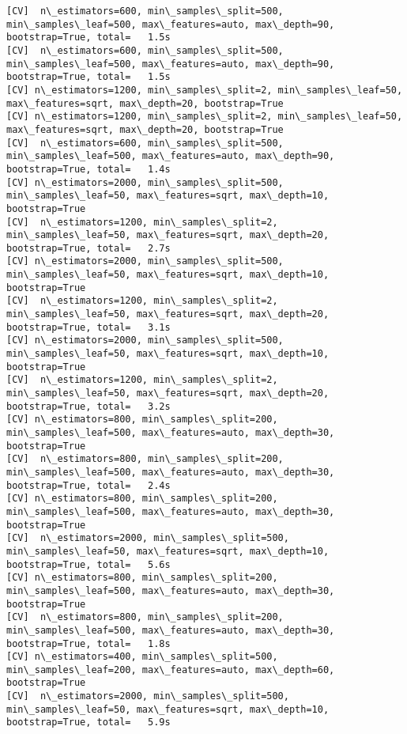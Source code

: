\documentclass[11pt]{article}
\begin{document}
    \begin{Verbatim}[commandchars=\\\{\}]
[CV]  n\_estimators=600, min\_samples\_split=500, min\_samples\_leaf=500, max\_features=auto, max\_depth=90, bootstrap=True, total=   1.5s
[CV]  n\_estimators=600, min\_samples\_split=500, min\_samples\_leaf=500, max\_features=auto, max\_depth=90, bootstrap=True, total=   1.5s
[CV] n\_estimators=1200, min\_samples\_split=2, min\_samples\_leaf=50, max\_features=sqrt, max\_depth=20, bootstrap=True 
[CV] n\_estimators=1200, min\_samples\_split=2, min\_samples\_leaf=50, max\_features=sqrt, max\_depth=20, bootstrap=True 
[CV]  n\_estimators=600, min\_samples\_split=500, min\_samples\_leaf=500, max\_features=auto, max\_depth=90, bootstrap=True, total=   1.4s
[CV] n\_estimators=2000, min\_samples\_split=500, min\_samples\_leaf=50, max\_features=sqrt, max\_depth=10, bootstrap=True 
[CV]  n\_estimators=1200, min\_samples\_split=2, min\_samples\_leaf=50, max\_features=sqrt, max\_depth=20, bootstrap=True, total=   2.7s
[CV] n\_estimators=2000, min\_samples\_split=500, min\_samples\_leaf=50, max\_features=sqrt, max\_depth=10, bootstrap=True 
[CV]  n\_estimators=1200, min\_samples\_split=2, min\_samples\_leaf=50, max\_features=sqrt, max\_depth=20, bootstrap=True, total=   3.1s
[CV] n\_estimators=2000, min\_samples\_split=500, min\_samples\_leaf=50, max\_features=sqrt, max\_depth=10, bootstrap=True 
[CV]  n\_estimators=1200, min\_samples\_split=2, min\_samples\_leaf=50, max\_features=sqrt, max\_depth=20, bootstrap=True, total=   3.2s
[CV] n\_estimators=800, min\_samples\_split=200, min\_samples\_leaf=500, max\_features=auto, max\_depth=30, bootstrap=True 
[CV]  n\_estimators=800, min\_samples\_split=200, min\_samples\_leaf=500, max\_features=auto, max\_depth=30, bootstrap=True, total=   2.4s
[CV] n\_estimators=800, min\_samples\_split=200, min\_samples\_leaf=500, max\_features=auto, max\_depth=30, bootstrap=True 
[CV]  n\_estimators=2000, min\_samples\_split=500, min\_samples\_leaf=50, max\_features=sqrt, max\_depth=10, bootstrap=True, total=   5.6s
[CV] n\_estimators=800, min\_samples\_split=200, min\_samples\_leaf=500, max\_features=auto, max\_depth=30, bootstrap=True 
[CV]  n\_estimators=800, min\_samples\_split=200, min\_samples\_leaf=500, max\_features=auto, max\_depth=30, bootstrap=True, total=   1.8s
[CV] n\_estimators=400, min\_samples\_split=500, min\_samples\_leaf=200, max\_features=auto, max\_depth=60, bootstrap=True 
[CV]  n\_estimators=2000, min\_samples\_split=500, min\_samples\_leaf=50, max\_features=sqrt, max\_depth=10, bootstrap=True, total=   5.9s

\end{Verbatim}
\end{document}

